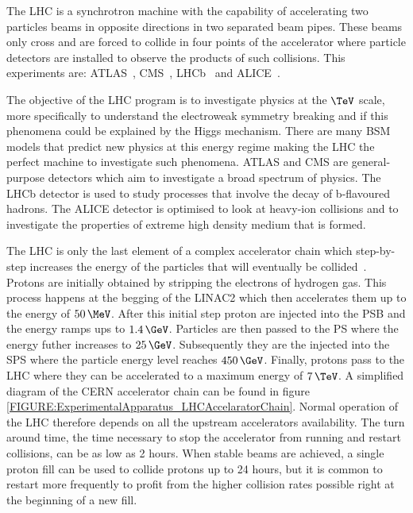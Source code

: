 The \gls{LHC} is a synchrotron machine with the capability of accelerating two particles beams in opposite directions in two separated beam pipes. These beams only cross and are forced to collide in four points of the accelerator where particle detectors are installed to observe the products of such collisions. This experiments are: \gls{ATLAS}~\cite{ARTICLE:TheATLASExperiment}, \gls{CMS}~\cite{ARTICLE:TheCMSExperiment}, \gls{LHCb}~\cite{ARTICLE:TheLHCbExperiment} and \gls{ALICE}~\cite{ARTICLE:TheALICEExperiment}.

The objective of the \gls{LHC} program is to investigate physics at the $\TeV$ scale, more specifically to understand the electroweak symmetry breaking and if this phenomena could be explained by the Higgs mechanism. There are many \gls{BSM} models that predict new physics at this energy regime making the \gls{LHC} the perfect machine to investigate such phenomena. \gls{ATLAS} and \gls{CMS} are general-purpose detectors which aim to investigate a broad spectrum of physics. The \gls{LHCb} detector is used to study processes that involve the decay of b-flavoured hadrons. The \gls{ALICE} detector is optimised to look at heavy-ion collisions and to investigate the properties of extreme high density medium that is formed.

The \gls{LHC} is only the last element of a complex accelerator chain which step-by-step increases the energy of the particles that will eventually be collided~\cite{ARTICLE:LHCMachine}. Protons are initially obtained by stripping the electrons of hydrogen gas. This process happens at the begging of the \gls{LINAC2} which then accelerates them up to the energy of $50\,\MeV$. After this initial step proton are injected into the \gls{PSB} and the energy ramps ups to $1.4\,\GeV$. Particles are then passed to the \gls{PS} where the energy futher increases to $25\,\GeV$. Subsequently they are the injected into the \gls{SPS} where the particle energy level reaches $450\,\GeV$. Finally, protons pass to the \gls{LHC} where they can be accelerated to a maximum energy of $7\,\TeV$. A simplified diagram of the \gls{CERN} accelerator chain can be found in figure \ref{FIGURE:ExperimentalApparatus_LHCAccelaratorChain}. 
Normal operation of the \gls{LHC} therefore depends on all the upstream accelerators availability. The turn around time, the time necessary to stop the accelerator from running and restart collisions, can be as low as 2 hours. When stable beams are achieved, a single proton fill can be used to collide protons up to 24 hours, but it is common to restart more frequently to profit from the higher collision rates possible right at the beginning of a new fill.


